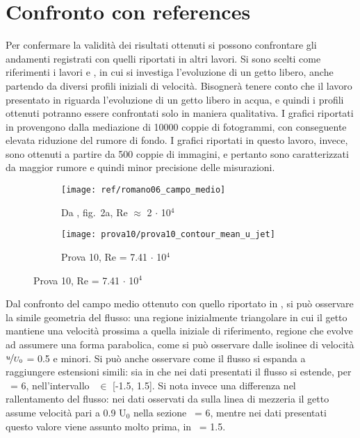 \documentclass{article} %
\newcommand{\xd}{\nicefrac{\textrm{x}}{\textrm{D}}\ }
\newcommand{\yd}{\nicefrac{\textrm{y}}{\textrm{D}}\ }
\begin{document}
\section{Confronto con references}
Per confermare la validità dei risultati ottenuti si possono confrontare gli andamenti registrati con quelli riportati in altri lavori. Si sono scelti come riferimenti i lavori \cite{falchi09} e \cite{bradbury65}, in cui si investiga l'evoluzione di un getto libero, anche partendo da diversi profili iniziali di velocità. Bisognerà tenere conto che il lavoro presentato in \cite{falchi09} riguarda l'evoluzione di un getto libero in acqua, e quindi i profili ottenuti potranno essere confrontati solo in maniera qualitativa. I grafici riportati in \cite{falchi09} provengono dalla mediazione di 10000 coppie di fotogrammi, con conseguente elevata riduzione del rumore di fondo. I grafici riportati in questo lavoro, invece, sono ottenuti a partire da 500 coppie di immagini, e pertanto sono caratterizzati da maggior rumore e quindi minor precisione delle misurazioni.
\begin{figure}[h!]
	\centering
	\begin{subfigure}{0.4\textwidth}
		\texttt{[image: ref/romano06\_campo\_medio]}
		\caption{Da \cite{falchi09}, fig.~2a, Re $\approx$ 2 $\cdot$ 10$^4$}
	\end{subfigure}
	\begin{subfigure}{0.4\textwidth}
		\texttt{[image: prova10/prova10\_contour\_mean\_u\_jet]}
		\caption{Prova 10, Re = 7.41 $\cdot$ 10$^4$}
	\end{subfigure}
\end{figure}\par
Dal confronto del campo medio ottenuto con quello riportato in \cite{falchi09}, si può osservare la simile geometria del flusso: una regione inizialmente triangolare in cui il getto mantiene una velocità prossima a quella iniziale di riferimento, regione che evolve ad assumere una forma parabolica, come si può osservare dalle isolinee di velocità $\nicefrac{u}{U_0}$ = 0.5 e minori. Si può anche osservare come il flusso si espanda a raggiungere estensioni simili: sia in \cite{falchi09} che nei dati presentati il flusso si estende, per \xd = 6, nell'intervallo \yd $\in$ [-1.5, 1.5]. Si nota invece una differenza nel rallentamento del flusso: nei dati osservati da \cite{falchi09} sulla linea di mezzeria il getto assume velocità pari a 0.9 U$_0$ nella sezione \xd = 6, mentre nei dati presentati questo valore viene assunto molto prima, in \xd = 1.5.\par
\end{document}
